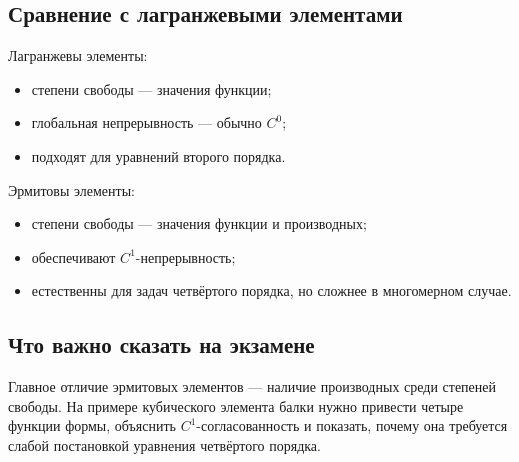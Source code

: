 \subsection{Сравнение с лагранжевыми элементами}

Лагранжевы элементы:
\begin{itemize}
    \item степени свободы --- значения функции;
    \item глобальная непрерывность --- обычно $C^0$;
    \item подходят для уравнений второго порядка.
\end{itemize}

Эрмитовы элементы:
\begin{itemize}
    \item степени свободы --- значения функции и производных;
    \item обеспечивают $C^1$-непрерывность;
    \item естественны для задач четвёртого порядка, но сложнее в многомерном случае.
\end{itemize}

\subsection{Что важно сказать на экзамене}

Главное отличие эрмитовых элементов --- наличие производных среди степеней
свободы. На примере кубического элемента балки нужно привести четыре функции
формы, объяснить $C^1$-согласованность и показать, почему она требуется слабой
постановкой уравнения четвёртого порядка.

\newpage
